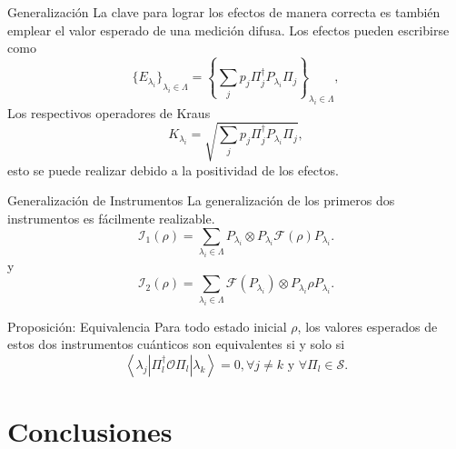 \documentclass[svgnames,12pt,aspectratio=149]{beamer}
\newcommand{\tensor}{\otimes}
\newcommand{\fuzzy}[1]{\mathcal{F}\left(#1\right)}
\newcommand{\permutdagger}[2]{\Pi_{#1}^{\dagger}#2\Pi_{#1}}
\begin{document}
\begin{frame}{Generalización}
  La clave para lograr los efectos de manera correcta es también emplear el valor esperado de una medición difusa. Los efectos pueden escribirse como
  \begin{equation*}
      {\{E_{\lambda_i}\}}_{\lambda_i \in \Lambda}={\left\{\sum_{j} p_{j} \permutdagger{j}{P_{\lambda_i}}\right\}}_{\lambda_i \in \Lambda},
  \end{equation*}  
  Los respectivos operadores de Kraus 
  \begin{equation*}
     K_{\lambda_i}=\sqrt{\sum_{j} p_j \permutdagger{j}{P_{\lambda_i} }},
  \end{equation*} 
  esto se puede realizar debido a la positividad de los efectos.
\end{frame}


\begin{frame}{Generalización de Instrumentos}
  La generalización de los primeros dos instrumentos es fácilmente realizable.
\begin{equation*}
    \mathcal{I}_1(\rho)=\sum_{\lambda_i \in \Lambda }P_{\lambda_i}\otimes P_{\lambda_i}\fuzzy{\rho}P_{\lambda_i}.
\end{equation*} 
y
\begin{equation*}
  \mathcal{I}_2(\rho)= \sum_{\lambda_i \in \Lambda } \fuzzy{P_{\lambda_i}}\tensor P_{\lambda_i}\rho P_{\lambda_i}.
\end{equation*} 

\begin{block}{Proposición: Equivalencia}
  Para todo estado inicial $\rho$, los valores esperados de estos dos instrumentos
cuánticos son equivalentes si y solo si \[\left \langle \lambda_j \left|\Pi_l^\dagger
\mathcal{O} \Pi_l\right|\lambda_k\right\rangle=0,\forall j\ne k \text{ y }
\forall \Pi_l \in \mathcal{S}.\]
\end{block} 




\end{frame}




\section{Conclusiones}
\end{document}
